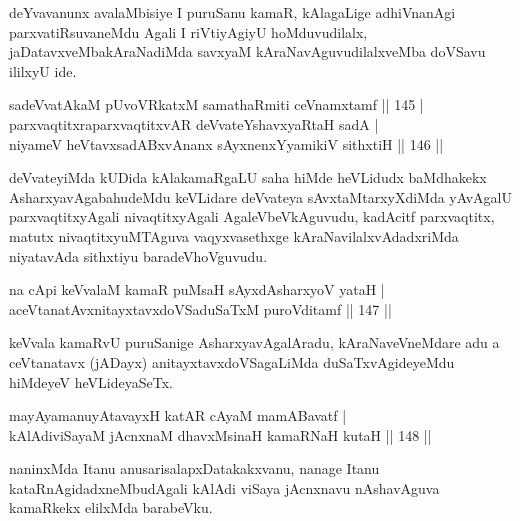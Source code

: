\begin{artha}
deYvavanunx avalaMbisiye I puruSanu kamaR, kAlagaLige adhiVnanAgi  parxvatiRsuvaneMdu Agali I riVtiyAgiyU hoMduvudilalx, jaDatavxveMbakAraNadiMda savxyaM kAraNavAguvudilalxveMba doVSavu ililxyU ide.
\end{artha}


\begin{shl}
sadeVvatAkaM pUvoVRkatxM samathaRmiti ceVnamxtamf \hfill || 145 |\\
parxvaqtitxraparxvaqtitxvAR deVvateYshavxyaRtaH sadA |\\
niyameV heVtavxsadABxvAnanx sAyxnenxYyamikiV sithxtiH \hfill || 146 ||
\end{shl}

\begin{artha}
deVvateyiMda kUDida kAlakamaRgaLU saha hiMde heVLidudx baMdhakekx AsharxyavAgabahudeMdu keVLidare deVvateya sAvxtaMtarxyXdiMda yAvAgalU parxvaqtitxyAgali nivaqtitxyAgali AgaleVbeVkAguvudu, kadAcitf parxvaqtitx, matutx nivaqtitxyuMTAguva vaqyxvasethxge kAraNavilalxvAdadxriMda niyatavAda sithxtiyu baradeVhoVguvudu.
\end{artha}


\begin{shl}
na cApi keVvalaM kamaR puMsaH sAyxdAsharxyoV yataH |\\
aceVtanatAvxnitayxtavxdoVSaduSaTxM puroVditamf \hfill || 147 ||
\end{shl}

\begin{artha}
keVvala kamaRvU puruSanige AsharxyavAgalAradu, kAraNaveVneMdare adu a ceVtanatavx (jADayx) anitayxtavxdoVSagaLiMda duSaTxvAgideyeMdu hiMdeyeV heVLideyaSeTx.
\end{artha}

\begin{shl}
mayA\s yamanuyAtavayxH katAR cAyaM mamABavatf |\\
kAlAdiviSayaM jAcnxnaM dhavxMsinaH kamaRNaH kutaH \hfill || 148 ||
\end{shl}

\begin{artha}
naninxMda Itanu anusarisalapxDatakakxvanu, nanage Itanu kataRnAgidadxneMbudAgali kAlAdi viSaya jAcnxnavu nAshavAguva kamaRkekx elilxMda barabeVku.
\end{artha}

